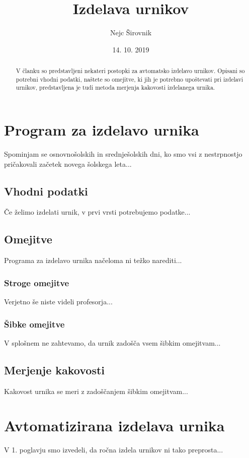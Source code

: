 \documentclass{article}
\title{Izdelava urnikov}
\author{Nejc Širovnik}
\date{14. 10. 2019}
\begin{document}
\maketitle

\begin{abstract}
V članku so predstavljeni nekateri postopki za avtomatsko izdelavo urnikov. Opisani so
potrebni vhodni podatki, naštete so omejitve, ki jih je potrebno upoštevati pri izdelavi
urnikov, predstavljena je tudi metoda merjenja kakovosti izdelanega urnika.
\end{abstract}

\section{Program za izdelavo urnika}
Spominjam se osnovnošolskih in srednješolskih dni, ko smo vsi z nestrpnostjo pričakovali
začetek novega šolskega leta...

\subsection{Vhodni podatki}
Če želimo izdelati urnik, v prvi vrsti potrebujemo podatke...

\subsection{Omejitve}
Programa za izdelavo urnika načeloma ni težko narediti...

\subsubsection{Stroge omejitve}
Verjetno še niste videli profesorja...

\subsubsection{Šibke omejitve}
V splošnem ne zahtevamo, da urnik zadošča vsem šibkim omejitvam...

\subsection{Merjenje kakovosti}
Kakovost urnika se meri z zadoščanjem šibkim omejitvam...

\section{Avtomatizirana izdelava urnika}
V 1. poglavju smo izvedeli, da ročna izdela urnikov ni tako preprosta...
\end{document}
